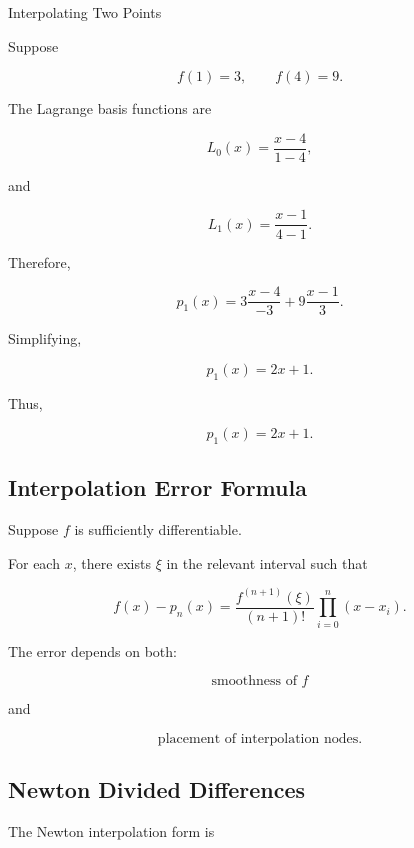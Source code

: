 \begin{workedexamplebox}{Interpolating Two Points}

Suppose

\[
f(1)=3,
\qquad
f(4)=9.
\]

The Lagrange basis functions are

\[
L_0(x)
=
\frac{x-4}{1-4},
\]

and

\[
L_1(x)
=
\frac{x-1}{4-1}.
\]

Therefore,

\[
p_1(x)
=
3
\frac{x-4}{-3}
+
9
\frac{x-1}{3}.
\]

Simplifying,

\[
p_1(x)
=
2x+1.
\]

Thus,

\begin{answerbox}
\[
\boxed{
p_1(x)=2x+1.
}
\]
\end{answerbox}

\end{workedexamplebox}

\subsection{Interpolation Error Formula}
\label{subsec:interpolation-error-formula}

Suppose \(f\) is sufficiently differentiable.

For each \(x\), there exists \(\xi\) in the relevant interval such that

\[
\boxed{
f(x)-p_n(x)
=
\frac{
f^{(n+1)}(\xi)
}{
(n+1)!
}
\prod_{i=0}^{n}
(x-x_i).
}
\]

The error depends on both:

\[
\boxed{
\text{smoothness of }f
}
\]

and

\[
\boxed{
\text{placement of interpolation nodes}.
}
\]

\subsection{Newton Divided Differences}
\label{subsec:newton-divided-differences}

The Newton interpolation form is


